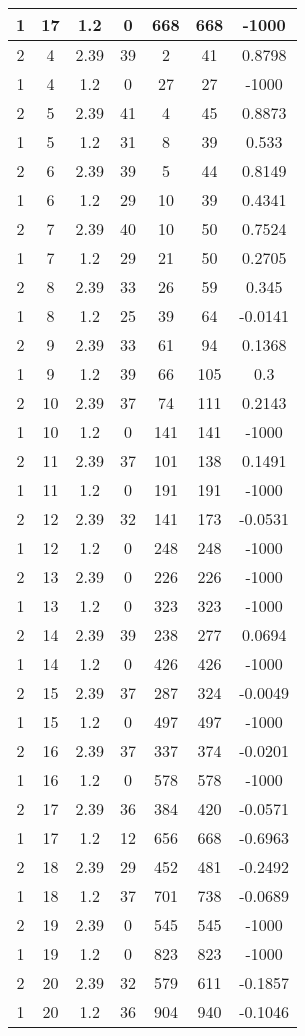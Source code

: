 \documentclass[letterpaper, 12pt]{article}
\begin{document}
\begin{longtable}{|c|c|c|c|c|c|c|}
\hline
1 & 17 & 1.2 & 0 & 668 & 668 & -1000 \\
\hline
2 & 4 & 2.39 & 39 & 2 & 41 & 0.8798 \\
\hline
1 & 4 & 1.2 & 0 & 27 & 27 & -1000 \\
\hline
2 & 5 & 2.39 & 41 & 4 & 45 & 0.8873 \\
\hline
1 & 5 & 1.2 & 31 & 8 & 39 & 0.533 \\
\hline
2 & 6 & 2.39 & 39 & 5 & 44 & 0.8149 \\
\hline
1 & 6 & 1.2 & 29 & 10 & 39 & 0.4341 \\
\hline
2 & 7 & 2.39 & 40 & 10 & 50 & 0.7524 \\
\hline
1 & 7 & 1.2 & 29 & 21 & 50 & 0.2705 \\
\hline
2 & 8 & 2.39 & 33 & 26 & 59 & 0.345 \\
\hline
1 & 8 & 1.2 & 25 & 39 & 64 & -0.0141 \\
\hline
2 & 9 & 2.39 & 33 & 61 & 94 & 0.1368 \\
\hline
1 & 9 & 1.2 & 39 & 66 & 105 & 0.3 \\
\hline
2 & 10 & 2.39 & 37 & 74 & 111 & 0.2143 \\
\hline
1 & 10 & 1.2 & 0 & 141 & 141 & -1000 \\
\hline
2 & 11 & 2.39 & 37 & 101 & 138 & 0.1491 \\
\hline
1 & 11 & 1.2 & 0 & 191 & 191 & -1000 \\
\hline
2 & 12 & 2.39 & 32 & 141 & 173 & -0.0531 \\
\hline
1 & 12 & 1.2 & 0 & 248 & 248 & -1000 \\
\hline
2 & 13 & 2.39 & 0 & 226 & 226 & -1000 \\
\hline
1 & 13 & 1.2 & 0 & 323 & 323 & -1000 \\
\hline
2 & 14 & 2.39 & 39 & 238 & 277 & 0.0694 \\
\hline
1 & 14 & 1.2 & 0 & 426 & 426 & -1000 \\
\hline
2 & 15 & 2.39 & 37 & 287 & 324 & -0.0049 \\
\hline
1 & 15 & 1.2 & 0 & 497 & 497 & -1000 \\
\hline
2 & 16 & 2.39 & 37 & 337 & 374 & -0.0201 \\
\hline
1 & 16 & 1.2 & 0 & 578 & 578 & -1000 \\
\hline
2 & 17 & 2.39 & 36 & 384 & 420 & -0.0571 \\
\hline
1 & 17 & 1.2 & 12 & 656 & 668 & -0.6963 \\
\hline
2 & 18 & 2.39 & 29 & 452 & 481 & -0.2492 \\
\hline
1 & 18 & 1.2 & 37 & 701 & 738 & -0.0689 \\
\hline
2 & 19 & 2.39 & 0 & 545 & 545 & -1000 \\
\hline
1 & 19 & 1.2 & 0 & 823 & 823 & -1000 \\
\hline
2 & 20 & 2.39 & 32 & 579 & 611 & -0.1857 \\
\hline
1 & 20 & 1.2 & 36 & 904 & 940 & -0.1046 \\
\hline
\end{longtable}
\end{document}
